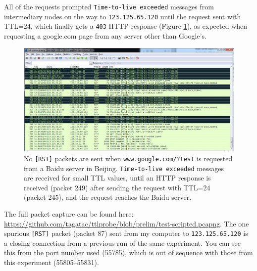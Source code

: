 All of the requests prompted \texttt{Time-to-live exceeded} messages from intermediary nodes on the way to \texttt{123.125.65.120} until the request sent with TTL=24, which finally gets a \texttt{403} HTTP response (Figure \ref{fig_gfwtest}), as expected when requesting a google.com page from any server other than Google’s.
\begin{figure}
	\includegraphics[width=\textwidth]{figures/gfwtest}
	\caption{
		No \texttt{[RST]} packets are sent when \texttt{www.google.com/?test} is requested from a Baidu server in Beijing.
		\texttt{Time-to-live exceeded} messages are received for small TTL values, until an HTTP response is received (packet 249) after sending the request with TTL=24 (packet 245), and the request reaches the Baidu server.
	}
	\label{fig_gfwtest}
\end{figure}
The full packet capture can be found here: \url{https://github.com/tagatac/ttlprobe/blob/prelim/test-scripted.pcapng}.
The one spurious \texttt{[RST]} packet (packet 87) sent from my computer to \texttt{123.125.65.120} is a closing connection from a previous run of the same experiment.
You can see this from the port number used (55785), which is out of sequence with those from this experiment (55805--55831).
